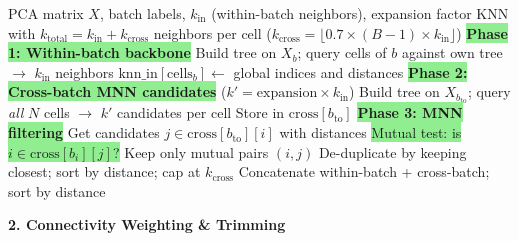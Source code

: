 \documentclass[8pt]{article}
\begin{document}
\vspace{4pt}

\begin{tcolorbox}[
    title={\textbf{Algorithm 1b:} bbknn\_optimized --- Within-batch Backbone + MNN Cross-batch},
    colback=lightgreen!20, colframe=added!80, fonttitle=\small\bfseries,
    boxrule=0.5pt, arc=2pt, left=4pt, right=4pt, top=2pt, bottom=2pt
]
\begin{algorithmic}[1]
\small
\Require PCA matrix $X$, batch labels, $k_\text{in}$ (within-batch neighbors), expansion factor
\Ensure KNN with $k_\text{total} = k_\text{in} + k_\text{cross}$ neighbors per cell ($k_\text{cross} = \lfloor 0.7 \times (B{-}1) \times k_\text{in} \rfloor$)
\State \colorbox{lightgreen}{\textbf{Phase 1: Within-batch backbone}} \Comment{\textcolor{added}{Preserves local manifold structure}}
    \State Build tree on $X_b$; query cells of $b$ against own tree $\to$ $k_\text{in}$ neighbors
    \State $\text{knn\_in}[\text{cells}_b] \gets$ global indices and distances
\EndFor
\State \colorbox{lightgreen}{\textbf{Phase 2: Cross-batch MNN candidates}} ($k' = \text{expansion} \times k_\text{in}$)
    \State Build tree on $X_{b_\text{to}}$; query \emph{all} $N$ cells $\to$ $k'$ candidates per cell
    \State Store in $\text{cross}[b_\text{to}]$ 
\EndFor
\State \colorbox{lightgreen}{\textbf{Phase 3: MNN filtering}} \Comment{\textcolor{added}{Keep only mutual nearest neighbors}}
        \State Get candidates $j \in \text{cross}[b_\text{to}][i]$ with distances
        \State \colorbox{lightgreen}{Mutual test: is $i \in \text{cross}[b_i][j]$?} 
        \State Keep only mutual pairs $(i, j)$
    \EndFor
    \State De-duplicate by keeping closest; sort by distance; cap at $k_\text{cross}$
\EndFor
\State Concatenate within-batch + cross-batch; sort by distance
\end{algorithmic}
\end{tcolorbox}

\vspace{6pt}

{\large\bfseries 2. Connectivity Weighting \& Trimming}

\vspace{3pt}
\end{document}
